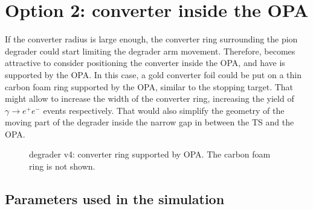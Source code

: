 %
\section{Option 2: converter inside the OPA}
\label{section:geometry_v4}
If the converter radius is large enough, the converter ring surrounding the pion degrader
could start limiting the degrader arm movement. 
Therefore, becomes attractive to consider positioning the converter inside the OPA,
and have is supported by the OPA. In this case, a gold converter foil could be put
on a thin carbon foam ring supported by the OPA, similar to the stopping target.
That might allow to increase the width of the converter ring, increasing the yield
of $\gamma \to e^+e^-$ events respectively. That would also simplify the geometry
of the moving part of the degrader inside the narrow gap in between the TS and the OPA.

\begin{figure}[H]
  \caption{
    \label{figure:degrader_v4}
    degrader v4: converter ring supported by OPA. The carbon foam ring is not shown.
  }
\end{figure}

\newpage
\subsection{Parameters used in the simulation}

